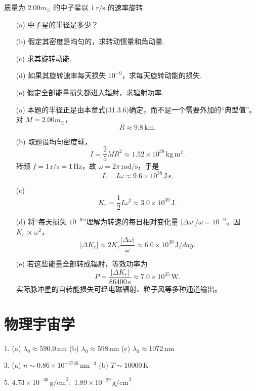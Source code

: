 \begin{exercise}\label{ex:31.6}
质量为 $2.00 m_\odot$ 的中子星以 $1 \ \mathrm{r/s}$ 的速率旋转. 
\begin{enumerate}
  \item[(a)] 中子星的半径是多少？
  \item[(b)] 假定其密度是均匀的，求转动惯量和角动量. 
  \item[(c)] 求其旋转动能. 
  \item[(d)] 如果其旋转速率每天损失 $10^{-9}$，求每天旋转动能的损失. 
  \item[(e)] 假定全部能量损失都进入辐射，求辐射功率.
\end{enumerate}
\end{exercise}
\begin{solution}
\begin{enumerate}
\item[(a)] 本题的半径正是由本章式(31.3.6)确定，而不是一个需要外加的“典型值”。对 $M=2.00m_\odot$，
\[
\boxed{R\approx9.8\,\mathrm{km}}.
\]

\item[(b)] 取题设均匀密度球，
\[
I=\frac25MR^2
\approx1.52\times10^{38}\,\mathrm{kg\,m^2}.
\]
转频 $f=1\,\mathrm{r/s}=1\,\mathrm{Hz}$，故 $\omega=2\pi\,\mathrm{rad/s}$，于是
\[
\boxed{L=I\omega\approx9.6\times10^{38}\,\mathrm{J\,s}}.
\]

\item[(c)]
\[
\boxed{K_r=\frac12I\omega^2\approx3.0\times10^{39}\,\mathrm J}.
\]

\item[(d)] 将“每天损失 $10^{-9}$”理解为转速的每日相对变化量
$|\Delta\omega|/\omega=10^{-9}$。因 $K_r\propto\omega^2$，
\[
|\Delta K_r|\approx2K_r\frac{|\Delta\omega|}{\omega}
\approx\boxed{6.0\times10^{30}\,\mathrm J/day}.
\]

\item[(e)] 若这些能量全部转成辐射，等效功率为
\[
\boxed{P=\frac{|\Delta K_r|}{86400\,\mathrm s}
\approx7.0\times10^{25}\,\mathrm W}.
\]
实际脉冲星的自转能损失可经电磁辐射、粒子风等多种通道输出。
\end{enumerate}
\end{solution}



\chapter{物理宇宙学}

\begin{oddanswers}
1. (a) $\lambda_0 \approx 590.0\,\mathrm{nm}$
(b) $\lambda_0 \approx 598\,\mathrm{nm}$
(c) $\lambda_0 \approx 1072\,\mathrm{nm}$

3. (a) $n \sim 0.86 \times 10^{-3746}\,\mathrm{nm^{-3}}$
(b) $T \sim 10000\,\mathrm{K}$

5. $4.73 \times 10^{-30}\,\mathrm{g/cm}^3;$
$1.89 \times 10^{-29}\,\mathrm{g/cm}^3$
\end{oddanswers}


